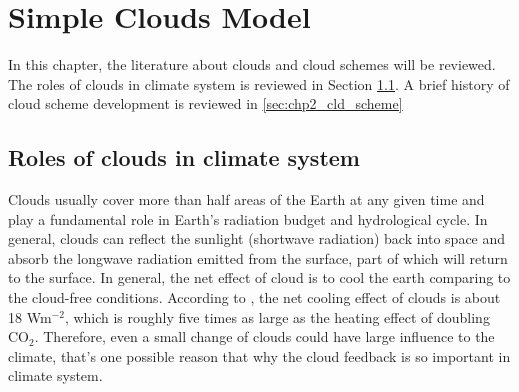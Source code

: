 
\chapter{Simple Clouds Model}  
\label{ch:chapter2}


In this chapter, the literature about clouds and cloud schemes will be reviewed. The roles of clouds in climate system is reviewed in Section \ref{sec:chp2_role_of_clouds}. A brief history of cloud scheme development is reviewed in  \ref{sec:chp2_cld_scheme}


\section{Roles of clouds in climate system}
\label{sec:chp2_role_of_clouds}

Clouds usually cover more than half areas of the Earth at any given time \citep{Houze2014} and play a fundamental role in Earth's radiation budget and hydrological cycle. In general, clouds can reflect the sunlight (shortwave radiation) back into space and absorb the longwave radiation emitted from the surface, part of which will return to the surface. In general, the net effect of cloud is to cool the earth comparing to the cloud-free conditions. According to \cite{Zelinka2017}, the net cooling effect of clouds is about 18 Wm$^{-2}$, which is roughly five times as large as the heating effect of doubling CO$_2$. Therefore, even a small change of clouds could have large influence to the climate, that's one possible reason that why the cloud feedback is so important in climate system. \\



